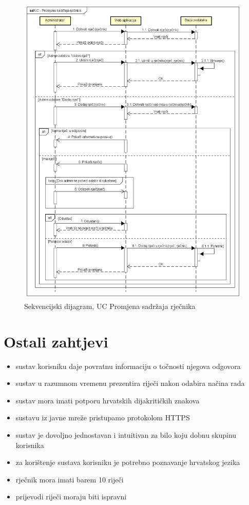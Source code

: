 \begin{figure}[p]
	\includegraphics[scale=0.55]{dijagrami/UC - Promjena sadrzaja rjecnika.png} 
	\centering
	\caption{Sekvencijski dijagram, UC Promjena sadržaja rječnika}
	\label{fig:uc-promjena-rjecnika}
\end{figure}


\section{Ostali zahtjevi}

\begin{itemize}
\item sustav korisniku daje povratnu informaciju o točnosti njegova odgovora
\item sustav u razumnom vremenu prezentira riječi nakon odabira načina rada
\item sustav mora imati potporu hrvatskih dijakritičkih znakova
\item sustavu iz javne mreže pristupamo protokolom HTTPS
\item sustav je dovoljno jednostavan i intuitivan za bilo koju dobnu skupinu korisnika 
\item za korištenje sustava korisniku je potrebno poznavanje hrvatskog jezika
\item rječnik mora imati barem 10 riječi
\item prijevodi riječi moraju biti ispravni
\end{itemize}
			 
			 
			 
	